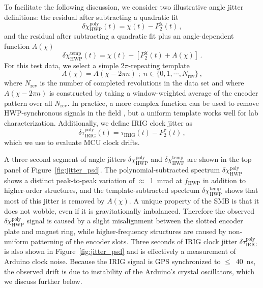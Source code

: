 To facilitate the following discussion, we consider two illustrative angle jitter definitions: the residual after subtracting a quadratic fit
\begin{equation}
\delta \chi_{\mathrm{HWP}}^{\mathrm{poly}}(t) = \chi(t) - P_{\mathrm{2}}^{\mathrm{\chi}}(t) \, ,
\label{eq:angle_poly_jitter}
\end{equation}
\noindent
and the residual after subtracting a quadratic fit plus an angle-dependent function $A(\chi)$
\begin{equation}
    \delta \chi_{\mathrm{HWP}}^{\mathrm{temp}}(t) = \chi(t) - \left[ P_{2}^{\chi}(t) + A(\chi) \right] \, .
\label{eq:angle_temp_jitter}
\end{equation}
\noindent
For this test data, we select a simple $2 \pi$-repeating template
\begin{equation}
    A(\chi) = A(\chi - 2 \pi n) \; ; \; n \in \{0, 1, \cdots, N_{\mathrm{rev}} \} \, ,
    \label{eq:template}
\end{equation}
where $N_{\mathrm{rev}}$ is the number of completed revolutions in the data set and where $A(\chi - 2 \pi n)$ is constructed by taking a window-weighted average of the encoder pattern over all $N_{\mathrm{rev}}$. In practice, a more complex function can be used to remove HWP-synchronous signals in the field \cite{essinger-hileman_systematic_2016}, but a uniform template works well for lab characterization. Additionally, we define IRIG clock jitter as
\begin{equation}
    \delta \tau_{\mathrm{IRIG}}^{\mathrm{poly}}(t) = \tau_{\mathrm{IRIG}}(t) - P_{2}^{\tau}(t) \, ,
\end{equation}
which we use to evaluate MCU clock drifts.

A three-second segment of angle jitters $\delta \chi_{\mathrm{HWP}}^{\mathrm{poly}}$ and $\delta \chi_{\mathrm{HWP}}^{\mathrm{temp}}$ are shown in the top panel of Figure~\ref{fig:jitter_psd}. The polynomial-subtracted spectrum $\delta \chi_{\mathrm{HWP}}^{\mathrm{poly}}$ shows a distinct peak-to-peak variation of $\approx$~1~mrad at $f_{\mathrm{HWP}}$ in addition to higher-order structures, and the template-subtracted spectrum $\delta \chi_{\mathrm{HWP}}^{\mathrm{temp}}$ shows that most of this jitter is removed by $A(\chi)$. A unique property of the SMB is that it does not wobble, even if it is gravitationally imbalanced. Therefore the observed $\delta \chi_{\mathrm{HWP}}^{\mathrm{poly}}$ signal is caused by a slight misalignment between the slotted encoder plate and magnet ring, while higher-frequency structures are caused by non-uniform patterning of the encoder slots. Three seconds of IRIG clock jitter $\delta \tau_{\mathrm{IRIG}}^{\mathrm{poly}}$ is also shown in Figure~\ref{fig:jitter_psd} and is effectively a measurement of Arduino clock noise. Because the IRIG signal is GPS synchronized to $\leq$~40~ns, the observed drift is due to instability of the Arduino's crystal oscillators, which we discuss further below.

